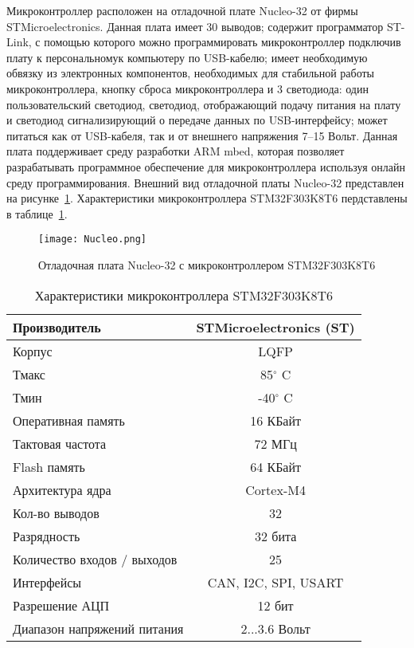 Микроконтроллер расположен на отладочной плате Nucleo-32 от фирмы STMicroelectronics. Данная плата имеет 30 выводов; содержит программатор ST-Link, с помощью которого можно программировать микроконтроллер подключив плату к персональномук компьютеру по USB-кабелю; имеет необходимую обвязку из электронных компонентов, необходимых для стабильной работы микроконтроллера, кнопку сброса микроконтроллера и 3 светодиода: один пользовательский светодиод, светодиод, отображающий подачу питания на плату и светодиод сигнализирующий о передаче данных по USB-интерфейсу; может питаться как от USB-кабеля, так и от внешнего напряжения 7--15 Вольт. Данная плата поддерживает среду разработки ARM mbed, которая позволяет разрабатывать программное обеспечение для микроконтроллера используя онлайн среду программирования. Внешний вид отладочной платы Nucleo-32 представлен на рисунке~\ref{Nucleo}. Характеристики микроконтроллера STM32F303K8T6 пердставлены в таблице~\ref{tabStm}.

\begin{figure}[h]
	\centering
	\texttt{[image: Nucleo.png]}%
	\caption{Отладочная плата Nucleo-32 с микроконтроллером STM32F303K8T6}
	\label{Nucleo}
\end{figure}

\begin{table}[h]
	\centering
	\caption{Характеристики микроконтроллера STM32F303K8T6}\label{tabStm}
	\begin{tabular}{|l|c|}
		\hline
		Производитель &	STMicroelectronics (ST) \\ \hline
		Корпус 	& LQFP \\ \hline
		Тмакс	&	85$^\circ$ C 	\\ \hline
		Тмин 	&	-40$^\circ$ C \\ \hline
		Оперативная память 	& 16 КБайт\\ \hline
		Тактовая частота	& 72 МГц 	\\ \hline
		Flash память & 64 КБайт\\ \hline
		Архитектура ядра & Cortex-M4	\\ \hline
		Кол-во выводов 	& 32\\ \hline
		Разрядность	& 32 бита\\ \hline
		Количество входов / выходов & 25	\\ \hline
		Интерфейсы 	& CAN, I2C, SPI, USART\\ \hline
		Разрешение АЦП & 12 бит\\ \hline
		Диапазон напряжений питания 	& 2...3.6 Вольт\\ \hline		
	\end{tabular}
\end{table}


